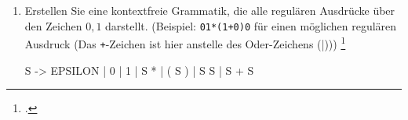 \documentclass{bschlangaul-aufgabe}
\begin{document}
\begin{enumerate}
\item Erstellen Sie eine kontextfreie Grammatik, die alle regulären
Ausdrücke über den Zeichen $0,1$ darstellt. (Beispiel:
\texttt{01*(1+0)0} für einen möglichen regulären Ausdruck (Das
\texttt{+}-Zeichen ist hier anstelle des Oder-Zeichens (|)))
\footcite[Aufgabe 2a)]{theo:ab:5}

\begin{bAntwort}

\begin{bProduktionsRegeln}
S -> EPSILON | 0 | 1 | S * | ( S ) | S S | S + S
\end{bProduktionsRegeln}
\end{bAntwort}

\end{enumerate}
\end{document}
